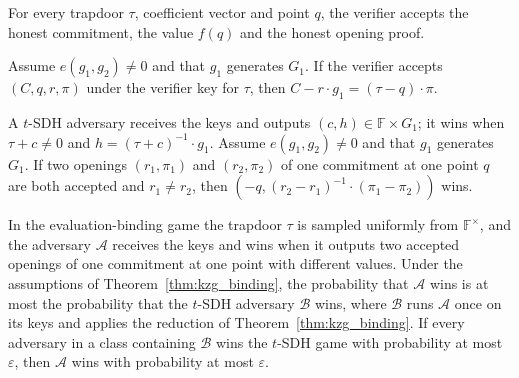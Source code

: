 \begin{theorem}\label{thm:kzg_correctness}
\leanok
{}
For every trapdoor $\tau$, coefficient vector and point $q$, the verifier accepts the honest
commitment, the value $f(q)$ and the honest opening proof.
\end{theorem}

\begin{lemma}\label{lem:kzg_opening_eq}
\leanok
{}
Assume $e(g_1,g_2)\neq 0$ and that $g_1$ generates $G_1$. If the verifier accepts $(C,q,r,\pi)$
under the verifier key for $\tau$, then $C-r\cdot g_1=(\tau-q)\cdot\pi$.
\end{lemma}

\begin{theorem}\label{thm:kzg_binding}
\leanok
{}
A $t$-SDH adversary receives the keys and outputs $(c,h)\in\mathbb{F}\times G_1$; it wins when
$\tau+c\neq 0$ and $h=(\tau+c)^{-1}\cdot g_1$. Assume $e(g_1,g_2)\neq 0$ and that $g_1$ generates
$G_1$. If two openings $(r_1,\pi_1)$ and $(r_2,\pi_2)$ of one commitment at one point $q$ are
both accepted and $r_1\neq r_2$, then $(-q,(r_2-r_1)^{-1}\cdot(\pi_1-\pi_2))$ wins.
\end{theorem}

\begin{corollary}\label{cor:kzg_binding_game}
\leanok
{}
In the evaluation-binding game the trapdoor $\tau$ is sampled uniformly from $\mathbb{F}^\times$,
and the adversary $\mathcal{A}$ receives the keys and wins when it outputs two accepted openings
of one commitment at one point with different values. Under the assumptions of
Theorem~\ref{thm:kzg_binding}, the probability that $\mathcal{A}$ wins is at most the
probability that the $t$-SDH adversary $\mathcal{B}$ wins, where $\mathcal{B}$ runs
$\mathcal{A}$ once on its keys and applies the reduction of Theorem~\ref{thm:kzg_binding}. If
every adversary in a class containing $\mathcal{B}$ wins the $t$-SDH game with probability at
most $\varepsilon$, then $\mathcal{A}$ wins with probability at most $\varepsilon$.
\end{corollary}


